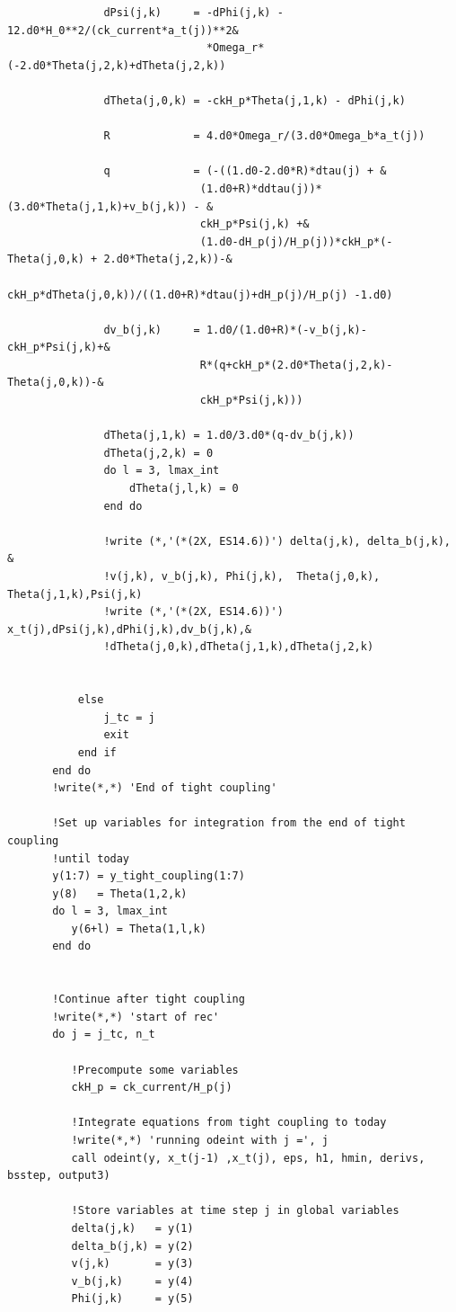 \documentclass[a4paper]{report}
\begin{document}
\begin{verbatim}
               dPsi(j,k)     = -dPhi(j,k) - 12.d0*H_0**2/(ck_current*a_t(j))**2&
                               *Omega_r*(-2.d0*Theta(j,2,k)+dTheta(j,2,k))

               dTheta(j,0,k) = -ckH_p*Theta(j,1,k) - dPhi(j,k)

               R             = 4.d0*Omega_r/(3.d0*Omega_b*a_t(j))

               q             = (-((1.d0-2.d0*R)*dtau(j) + &
                              (1.d0+R)*ddtau(j))*(3.d0*Theta(j,1,k)+v_b(j,k)) - &
                              ckH_p*Psi(j,k) +&
                              (1.d0-dH_p(j)/H_p(j))*ckH_p*(-Theta(j,0,k) + 2.d0*Theta(j,2,k))-&
                              ckH_p*dTheta(j,0,k))/((1.d0+R)*dtau(j)+dH_p(j)/H_p(j) -1.d0)
 
               dv_b(j,k)     = 1.d0/(1.d0+R)*(-v_b(j,k)-ckH_p*Psi(j,k)+&
                              R*(q+ckH_p*(2.d0*Theta(j,2,k)-Theta(j,0,k))-&
                              ckH_p*Psi(j,k)))

               dTheta(j,1,k) = 1.d0/3.d0*(q-dv_b(j,k))
               dTheta(j,2,k) = 0
               do l = 3, lmax_int
                   dTheta(j,l,k) = 0 
               end do	

               !write (*,'(*(2X, ES14.6))') delta(j,k), delta_b(j,k), &
               !v(j,k), v_b(j,k), Phi(j,k),  Theta(j,0,k), Theta(j,1,k),Psi(j,k)
               !write (*,'(*(2X, ES14.6))') x_t(j),dPsi(j,k),dPhi(j,k),dv_b(j,k),&
               !dTheta(j,0,k),dTheta(j,1,k),dTheta(j,2,k)


           else
               j_tc = j
               exit
           end if
       end do
       !write(*,*) 'End of tight coupling'

       !Set up variables for integration from the end of tight coupling 
       !until today
       y(1:7) = y_tight_coupling(1:7)
       y(8)   = Theta(1,2,k)
       do l = 3, lmax_int
          y(6+l) = Theta(1,l,k)
       end do


       !Continue after tight coupling
       !write(*,*) 'start of rec'       
       do j = j_tc, n_t

          !Precompute some variables
          ckH_p = ck_current/H_p(j)

          !Integrate equations from tight coupling to today
          !write(*,*) 'running odeint with j =', j
          call odeint(y, x_t(j-1) ,x_t(j), eps, h1, hmin, derivs, bsstep, output3)

          !Store variables at time step j in global variables
          delta(j,k)   = y(1)
          delta_b(j,k) = y(2)
          v(j,k)       = y(3)
          v_b(j,k)     = y(4)
          Phi(j,k)     = y(5)
          

\end{verbatim}
\end{document}
